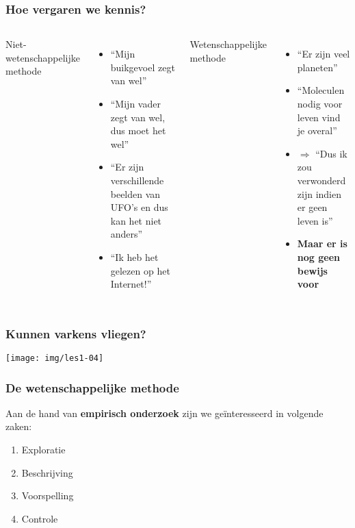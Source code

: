 \documentclass[aspectratio=169]{beamer}
\begin{document}
\begin{frame}
  \frametitle{Hoe vergaren we kennis?}

  \begin{columns}[c]

  Niet-wetenschappelijke methode
    \begin{itemize}
    \item ``Mijn buikgevoel zegt van wel''
    \item ``Mijn vader zegt van wel, dus moet het wel''
    \item ``Er zijn verschillende beelden van UFO's en dus kan het niet anders''
    \item ``Ik heb het gelezen op het Internet!''
    \end{itemize}

  \pause

  Wetenschappelijke methode
    \begin{itemize}
    \item ``Er zijn veel planeten''
    \item ``Moleculen nodig voor leven vind je overal''
    \item $\Rightarrow$ ``Dus ik zou verwonderd zijn indien er geen leven is''
    \item \textbf{Maar er is nog geen bewijs voor}
    \end{itemize}

  \end{columns}
\end{frame}

\begin{frame}
  \frametitle{Kunnen varkens vliegen?}
  \centering
  \texttt{[image: img/les1-04]}
\end{frame}

\begin{frame}
  \frametitle{De wetenschappelijke methode}

  Aan de hand van \textbf{empirisch onderzoek} zijn we geïnteresseerd in volgende zaken:

  \begin{enumerate}
    \item Exploratie
    \item Beschrijving
    \item Voorspelling
    \item Controle
  \end{enumerate}
\end{frame}
\end{document}
